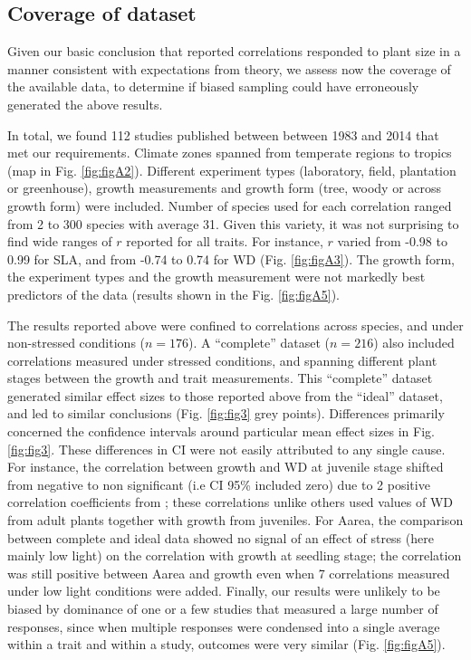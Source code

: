 \documentclass[a4paper,11pt]{article}
\begin{document}
\subsection*{Coverage of dataset}

Given our basic conclusion that reported correlations responded to plant size in a manner consistent with expectations from theory, we assess now the coverage of the available data, to determine if biased sampling could have erroneously generated the above results.

In total, we found 112 studies published between between 1983 and 2014 that met our requirements. Climate zones spanned from temperate regions to  tropics (map in Fig. \ref{fig:figA2}). Different experiment types (laboratory, field, plantation or greenhouse), growth measurements and growth form (tree, woody or across growth form) were included. Number of species used for each correlation ranged from 2 to 300 species with average 31. Given this variety, it was not surprising to find wide ranges of $r$ reported for all traits. For instance, $r$ varied from -0.98 to 0.99 for SLA, and from -0.74 to 0.74 for WD (Fig. \ref{fig:figA3}). The growth form, the experiment types and the growth measurement were not markedly best predictors of the data (results shown in the Fig. \ref{fig:figA5}).

The results reported above were confined to correlations across species, and under non-stressed conditions ($n = 176$). A ``complete'' dataset ($n = 216$) also included correlations measured under stressed conditions, and spanning different plant stages between the growth and trait measurements. This ``complete'' dataset generated similar effect sizes to those reported above from the ``ideal'' dataset, and led to similar conclusions (Fig. \ref{fig:fig3} grey points). Differences primarily concerned the confidence intervals around particular mean effect sizes in Fig. \ref{fig:fig3}. These differences in CI were not easily attributed to any single cause. For instance, the correlation between growth and WD at juvenile stage shifted from negative to non significant (i.e CI 95\% included zero) due to 2 positive correlation coefficients from \citet{Augspurger:1984ct};  these correlations unlike others used values of WD from adult plants together with growth from juveniles. For Aarea, the comparison between complete and ideal data showed no signal of an effect of stress (here mainly low light) on the correlation with growth at seedling stage; the correlation was still positive between Aarea and growth even when 7 correlations measured under low light conditions were added. Finally, our results were unlikely to be biased by dominance of one or a few studies that measured a large number of responses, since when multiple responses were condensed into a single average within a trait and within a study, outcomes were very similar (Fig. \ref{fig:figA5}).
\end{document}
